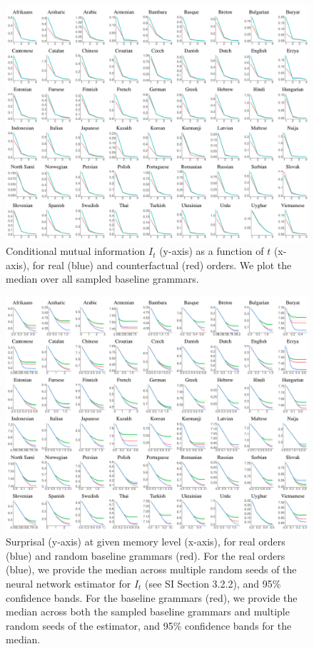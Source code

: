 \begin{figure}
	\begin{center}
\includegraphics[width=\textwidth]{it-table.pdf}
\end{center}
	\caption{Conditional mutual information $I_t$ (y-axis) as a function of $t$ (x-axis), for real (blue) and counterfactual (red) orders. We plot the median over all sampled baseline grammars. }\label{fig:it}
\end{figure}



\begin{figure}
	\begin{center}
\includegraphics[width=\textwidth]{results-table-mle.pdf}
\end{center}
	\caption{Surprisal (y-axis) at given memory level (x-axis), for real orders (blue) and random baseline grammars (red).
	For the real orders (blue), we provide the median across multiple random seeds of the neural network estimator for $I_t$ (see SI Section 3.2.2), and 95\% confidence bands.
	For the baseline grammars (red), we provide the median across both the sampled baseline grammars and multiple random seeds of the estimator, and 95\% confidence bands for the median.
}\label{fig:median-table-expt2}
\end{figure}


